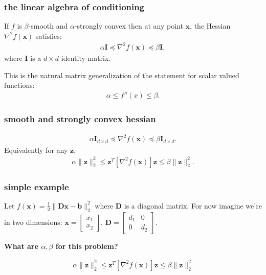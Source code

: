 \documentclass[compress]{beamer}
\newcommand{\bv}[1]{\mathbf{#1}}
\begin{document}
\begin{frame}[t]
	\frametitle{the linear algebra of conditioning}
	If $f$ is $\beta$-smooth and $\alpha$-strongly convex then at any point $\bv{x}$, the Hessian $\nabla^2 f(\bv{x})$ satisfies: 
	\begin{align*}
		\alpha\bv{I}\preceq \nabla^2 f(\bv{x}) \preceq \beta\bv{I},
	\end{align*}
	where $\bv{I}$ is a $d\times d$ identity matrix. 
	
	This is the natural matrix generalization of the statement for scalar valued functions:
	\begin{align*}
		\alpha \leq f''(x)\leq \beta.
	\end{align*}
	
\end{frame}

\begin{frame}[t]
	\frametitle{smooth and strongly convex hessian}
	\begin{align*}
		\alpha\bv{I}_{d\times d} \preceq \nabla^2 f(\bv{x}) \preceq \beta\bv{I}_{d\times d}.
	\end{align*}
	Equivalently for any $\bv{z}$,
	\begin{align*}
		\alpha\|\bv{z}\|_2^2 \leq \bv{z}^T[\nabla^2 f(\bv{x})]\bv{z} \leq \beta\|\bv{z}\|_2^2.
	\end{align*} 
\end{frame}

\begin{frame}[t]
	\frametitle{simple example}
	Let $f(\bv{x}) = \frac{1}{2}\|\bv{D}\bv{x} - \bv{b}\|_2^2$ where $\bv{D}$ is a diagonal matrix. For now imagine we're in two dimensions: $\bv{x} = \begin{bmatrix}
		x_1\\
		x_2
	\end{bmatrix}$, $\bv{D} = \begin{bmatrix}
		d_1 & 0 \\
		0 & d_2
	\end{bmatrix}
	$.
	\begin{center}
		\textbf{What are $\alpha,\beta$ for this problem?}
	\end{center}
	\begin{align*}
		\alpha\|\bv{z}\|_2^2 \leq \bv{z}^T[\nabla^2 f(\bv{x})]\bv{z} \leq \beta\|\bv{z}\|_2^2
	\end{align*}
\end{frame}
\end{document}
